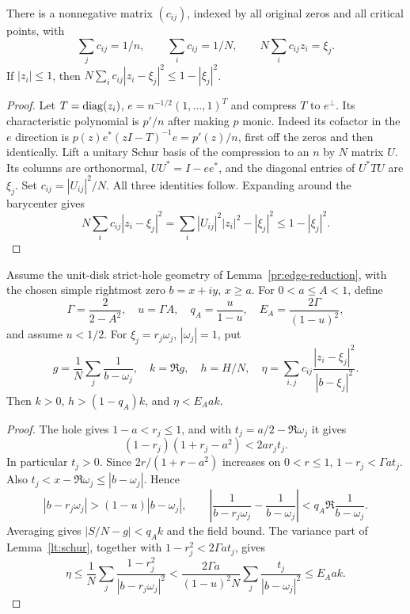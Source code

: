 \begin{lemma}\label{lt:schur}
There is a nonnegative matrix $(c_{ij})$, indexed by all original
zeros and all critical points, with
\[
 \sum_jc_{ij}=1/n,\qquad \sum_ic_{ij}=1/N,\qquad
 N\sum_ic_{ij}z_i=\xi_j.
\]
If $|z_i|\le1$, then
$N\sum_ic_{ij}|z_i-\xi_j|^2\le1-|\xi_j|^2$.
\end{lemma}
\begin{proof}
Let $T=\operatorname{diag}(z_i)$, $e=n^{-1/2}(1,\ldots,1)^T$ and compress
$T$ to $e^\perp$. Its characteristic polynomial is $p'/n$ after
making $p$ monic. Indeed its cofactor in the $e$ direction is
$p(z)e^*(zI-T)^{-1}e=p'(z)/n$, first off the zeros and then
identically. Lift a unitary Schur basis of the compression to an
$n$ by $N$ matrix $U$. Its columns are orthonormal,
$UU^*=I-ee^*$, and the diagonal entries of $U^*TU$ are
$\xi_j$. Set $c_{ij}=|U_{ij}|^2/N$. All three identities follow.
Expanding around the barycenter gives
\[
 N\sum_ic_{ij}|z_i-\xi_j|^2
  =\sum_i|U_{ij}|^2|z_i|^2-|\xi_j|^2\le1-|\xi_j|^2.
\]
\end{proof}

\begin{lemma}\label{lt:transport}
Assume the unit-disk strict-hole geometry of
Lemma~\ref{pr:edge-reduction}, with the chosen simple rightmost zero
$b=x+iy$, $x\ge a$. For $0<a\le A<1$, define
\[
 \Gamma=\frac2{2-A^2},\quad u=\Gamma A,\quad
 q_A=\frac{u}{1-u},\quad E_A=\frac{2\Gamma}{(1-u)^2},
\]
and assume $u<1/2$. For $\xi_j=r_j\omega_j$, $|\omega_j|=1$, put
\[
 g=\frac1N\sum_j\frac1{b-\omega_j},\quad k=\Re g,\quad h=H/N,
 \quad \eta=\sum_{i,j}c_{ij}\frac{|z_i-\xi_j|^2}{|b-\xi_j|^2}.
\]
Then $k>0$, $h>(1-q_A)k$, and $\eta<E_Aak$.
\end{lemma}
\begin{proof}
The hole gives $1-a<r_j\le1$, and with
$t_j=a/2-\Re\omega_j$ it gives
\[
 (1-r_j)(1+r_j-a^2)<2ar_jt_j.
\]
In particular $t_j>0$. Since $2r/(1+r-a^2)$ increases on
$0<r\le1$, $1-r_j<\Gamma at_j$. Also
$t_j<x-\Re\omega_j\le|b-\omega_j|$. Hence
\[
 |b-r_j\omega_j|>(1-u)|b-\omega_j|,\qquad
 \left|\frac1{b-r_j\omega_j}-\frac1{b-\omega_j}\right|
 <q_A\Re\frac1{b-\omega_j}.
\]
Averaging gives $|S/N-g|<q_Ak$ and the field bound. The variance
part of Lemma~\ref{lt:schur}, together with
$1-r_j^2<2\Gamma at_j$, gives
\[
 \eta\le\frac1N\sum_j\frac{1-r_j^2}{|b-r_j\omega_j|^2}
 <\frac{2\Gamma a}{(1-u)^2N}
       \sum_j\frac{t_j}{|b-\omega_j|^2}\le E_Aak.
\]
\end{proof}

